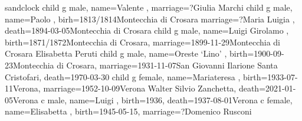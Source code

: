 \documentclass{article}
\begin{document}
\begin{midpage}
\begin{center}

\begin{genealogypicture}[
    processing=database,
    database format=full,
    node size=3.8cm,
    level size=2.8cm,
    level distance=6mm,
    list separators hang=3mm,
    name font=\bfseries,
    surn code={\textcolor{black!50!black}{#1}},
    place text={\newline}{},
    date format=d month yyyy,
    tcbset={male/.style={colframe=blue,colback=blue!5},
    female/.style={colframe=red,colback=red!5}},
    box={fit basedim=7pt,boxsep=2pt,segmentation style=solid,
        halign=left,before upper=\parskip1pt,
        \gtrDBsex,
    },
]
sandclock
{
    child{
        g{
            male,
            name={Valente },
            marriage={?}{Giulia Marchi}
        }
        child{
            g{
                male,
                name={Paolo },
                birh={1813/1814}{Montecchia di Crosara}
                marriage={?}{Maria Luigia },
                death={1894-03-05}{Montecchia di Crosara}
            }
            child{
                g{
                    male,
                    name={Luigi Girolamo },
                    birth={1871/1872}{Montecchia di Crosara},
                    marriage={1899-11-29}{Montecchia di Crosara \newline Elisabetta Peruti}
                }
                child{
                    g{
                        male,
                        name={Oreste `Lino' },
                        birth={1900-09-23}{Montecchia di Crosara},
                        marriage={1931-11-07}{San Giovanni Ilarione \newline Santa Cristofari},
                        death={1970-03-30}{}
                    }
                    child{
                        g{
                            female,
                            name={Mariateresa },
                            birth={1933-07-11}{Verona},
                            marriage={1952-10-09}{Verona \newline Walter Silvio Zanchetta},
                            death={2021-01-05}{Verona}
                        }
                    }
                    c{
                        male,
                        name={Luigi },
                        birth={1936}{},
                        death={1937-08-01}{Verona}
                    }
                    c{
                        female,
                        name={Elisabetta },
                        birth={1945-05-15}{},
                        marriage={?}{Domenico Rusconi}
                    }
                }
            }
        }
    }
}
\end{genealogypicture}

\end{center}
\end{midpage}
\end{document}
